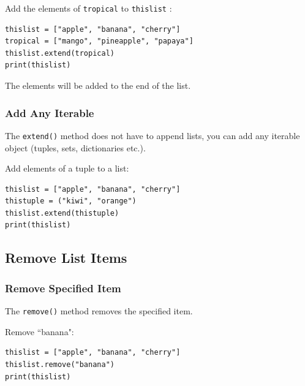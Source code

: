 \documentclass[12pt,a4paper]{article}
\newcommand{\code}[1]{%
	\colorbox{backcolour}{\lstinline{#1}}%
}
\newcommand{\lcode}[1]{%
	\lstinline{#1}%
}
\begin{document}
\begin{ebox}
Add the elements of \lcode{tropical} to \lcode{thislist}:
	\begin{lstlisting}
thislist = ["apple", "banana", "cherry"]
tropical = ["mango", "pineapple", "papaya"]
thislist.extend(tropical)
print(thislist)
	\end{lstlisting}
\tcblower
	\begin{vercode}
	\end{vercode}
\end{ebox}

The elements will be added to the end of the list.
\subsubsection{Add Any Iterable}

The \code{extend()} method does not have to append lists, you can add any
iterable object (tuples, sets, dictionaries etc.).

\begin{ebox}
Add elements of a tuple to a list:
	\begin{lstlisting}
thislist = ["apple", "banana", "cherry"]
thistuple = ("kiwi", "orange")
thislist.extend(thistuple)
print(thislist)
	\end{lstlisting}
\tcblower
	\begin{vercode}
	\end{vercode}
\end{ebox}
\subsection{Remove List Items}
\subsubsection{Remove Specified Item}

The \code{remove()} method removes the specified item.

\begin{ebox}
Remove ``banana":
	\begin{lstlisting}
thislist = ["apple", "banana", "cherry"]
thislist.remove("banana")
print(thislist)
	\end{lstlisting}
\tcblower
	\begin{vercode}
	\end{vercode}
\end{ebox}
\end{document}
